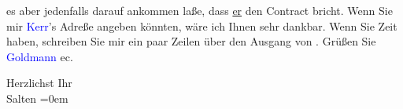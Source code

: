                es aber jedenfalls darauf ankommen laße, dass \uline{er} den
               Contract bricht. Wenn Sie mir \textcolor{blue}{Kerr}{}\ledrightnote{\textcolor{blue}{Alfred Kerr}}’s Adreße
               angeben könnten, wäre ich Ihnen sehr dankbar. Wenn Sie Zeit haben, schreiben Sie mir
               ein paar Zeilen über den Ausgang von \label{K_L03321-3v}\label{K_L03321-3h}. Grüßen Sie \textcolor{blue}{Goldmann}{}\ledrightnote{\textcolor{blue}{Paul Goldmann}} ec.\pend
           
\pstart
           Herzlichst Ihr {\\[\baselineskip]}\spacefill\mbox{Salten}\pend
           \leftskip=0em{}\endnumbering{}  
      